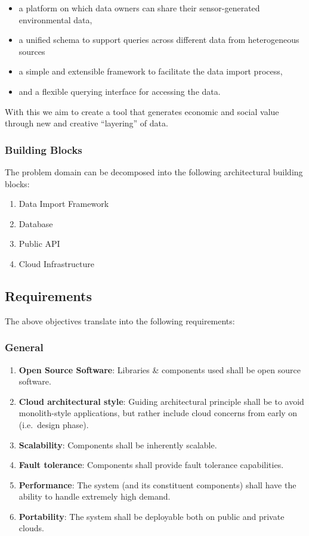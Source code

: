 \begin{itemize}
\tightlist
\item
  a platform on which data owners can share their sensor-generated
  environmental data,
\item
  a unified schema to support queries across different data from
  heterogeneous sources
\item
  a simple and extensible framework to facilitate the data import
  process,
\item
  and a flexible querying interface for accessing the data.
\end{itemize}

With this we aim to create a tool that generates economic and social
value through new and creative ``layering'' of data.

\subsubsection{Building Blocks}\label{building-blocks}

The problem domain can be decomposed into the following architectural
building blocks:

\begin{enumerate}
\def\labelenumi{\arabic{enumi}.}
\tightlist
\item
  Data Import Framework
\item
  Database
\item
  Public API
\item
  Cloud Infrastructure
\end{enumerate}

\subsection{Requirements}\label{requirements}

The above objectives translate into the following requirements:

\subsubsection{General}\label{general}

\begin{enumerate}
\def\labelenumi{\arabic{enumi}.}
\tightlist
\item
  \textbf{Open Source Software}: Libraries \& components used shall be
  open source software.
\item
  \textbf{Cloud architectural style}: Guiding architectural principle
  shall be to avoid monolith-style applications, but rather include
  cloud concerns from early on (i.e.~design phase).
\item
  \textbf{Scalability}: Components shall be inherently scalable.
\item
  \textbf{Fault tolerance}: Components shall provide fault tolerance
  capabilities.
\item
  \textbf{Performance}: The system (and its constituent components)
  shall have the ability to handle extremely high demand.
\item
  \textbf{Portability}: The system shall be deployable both on public
  and private clouds.
\end{enumerate}


